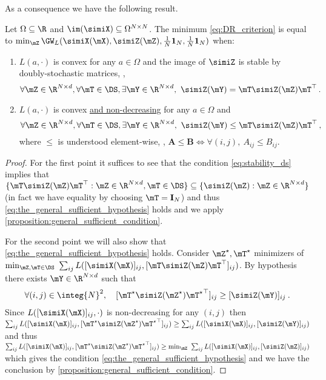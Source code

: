 As a consequence we have the following result.
\begin{proposition}
	\label{proposition:thetwoconditions}
	Let $\Omega \subseteq \R$ and $\im(\simiX) \subseteq \Omega^{N \times N}$. The minimum \cref{eq:DR_criterion} is equal to $\min_{\mZ} \GW_L(\simiX(\mX), \simiZ(\mZ), \frac{1}{N}\mathbf{1}_N, \frac{1}{N}\mathbf{1}_N)$ when:
	\begin{enumerate}[label=(\roman*), rightmargin=25pt]
		\item $L(a, \cdot)$ is convex for any $a \in \Omega$ and the image of $\simiZ$ is stable by \\
        doubly-stochastic matrices, \ie, 
		\begin{equation}
			\label{eq:stability_ds}
			\forall \mZ \in \R^{N \times d}, \forall \mT \in \DS, \exists \mY \in \R^{N \times d}, \ \simiZ(\mY) = \mT \simiZ(\mZ) \mT^\top\,.
		\end{equation}
		\item $L(a, \cdot)$ is convex \underline{and non-decreasing} for any $a \in \Omega$ and
		\begin{equation}
			\label{eq:another_condition_based_on_convexity}
			\forall \mZ \in \R^{N \times d}, \forall \mT \in \DS, \exists \mY \in \R^{N \times d}, \ \simiZ(\mY) \leq \mT \simiZ(\mZ) \mT^\top\,,
		\end{equation}
		where $\leq$ is understood element-wise, \ie, $\bm{A} \leq \bm{B} \iff \forall (i,j), \ A_{ij} \leq B_{ij}$. 
	\end{enumerate}
\end{proposition}
\begin{proof}
	For the first point it suffices to see that the condition \cref{eq:stability_ds} implies that $\{\mT \simiZ(\mZ) \mT^\top: \mZ \in \R^{N \times d}, \mT \in \DS\} \subseteq \{\simiZ(\mZ): \mZ \in \R^{N \times d}\}$ (in fact we have equality by choosing $\mT = \mathbf{I}_N$) and thus \cref{eq:the_general_sufficient_hypothesis} holds and we apply \cref{proposition:general_sufficient_condition}.
	
	For the second point we will also show that \cref{eq:the_general_sufficient_hypothesis} holds. Consider $\mZ^\star, \mT^\star$ minimizers of $\min_{\mZ, \mT \in \DS} \ \sum_{ij} L([\simiX(\mX)]_{ij}, [\mT \simiZ(\mZ) \mT^\top]_{ij})$. By hypothesis there exists $\mY \in \R^{N \times d}$ such that 
    \begin{align}
        \forall (i,j) \in \integ{N}^2, \quad [\mT^\star \simiZ(\mZ^\star) {\mT^{\star}}^\top]_{ij} \geq [\simiZ(\mY)]_{ij} \:.
    \end{align}
    Since $L([\simiX(\mX)]_{ij}, \cdot)$ is non-decreasing for any $(i,j)$ then $\sum_{ij} L([\simiX(\mX)]_{ij}, [\mT^\star \simiZ(\mZ^\star) {\mT^{\star}}^\top]_{ij}) \geq \sum_{ij} L([\simiX(\mX)]_{ij}, [\simiZ(\mY)]_{ij})$ and thus $\sum_{ij} L([\simiX(\mX)]_{ij}, [\mT^\star \simiZ(\mZ^\star) {\mT^{\star}}^\top]_{ij}) \geq \min_{\mZ} \ \sum_{ij} L([\simiX(\mX)]_{ij}, [\simiZ(\mZ)]_{ij})$ which gives the condition \cref{eq:the_general_sufficient_hypothesis} and we have the conclusion by \cref{proposition:general_sufficient_condition}. 
\end{proof}

